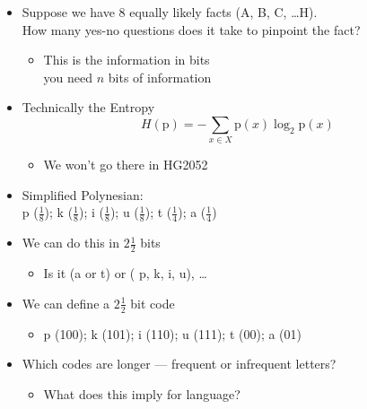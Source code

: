 \documentclass[a4paper,landscape,headrule,footrule,xetex]{foils}
\begin{document}

\begin{itemize}
\item Suppose we have 8 equally likely facts (A, B, C, \ldots H). 
 \\ How many yes-no   questions does it take to pinpoint the fact?
  \begin{itemize}
  \item This is the information in bits
\\ you need $n$ bits of information
  \end{itemize}
  \item Technically the Entropy %
 \[ H(\mathrm{p}) = -\sum_{x \in X} \mathrm{p}(x)\log_2\mathrm{p}(x) \]
    \begin{itemize}
    \item  We won't go there in HG2052
    \end{itemize}
  \end{itemize}


\begin{itemize}
\item Simplified Polynesian:
\\  p ($\frac{1}{8}$);
k ($\frac{1}{8}$);
i ($\frac{1}{8}$);
u ($\frac{1}{8}$);
   t ($\frac{1}{4}$);
   a ($\frac{1}{4}$)
\item We can do this in $2 \frac{1}{2}$ bits
  \begin{itemize}
  \item Is it (a or t) or ( p, k, i, u), \ldots
  \end{itemize}
\item We can define a $2 \frac{1}{2}$ bit code 
  \begin{itemize}
  \item p (100); k (101); i (110); u (111); t (00);  a (01)  
  \end{itemize}
\item Which codes are longer --- frequent or infrequent letters?
  \begin{itemize}
  \item What does this imply for language?
  \end{itemize}
\end{itemize}

\citep[\S2.2]{Manning:Schuetze:1999}


\end{document}
